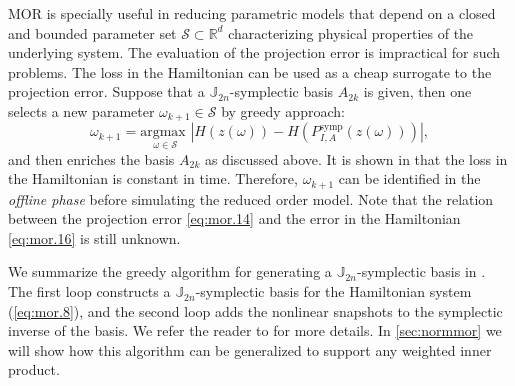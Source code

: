 MOR is specially useful in reducing parametric models that depend on a closed and bounded parameter set $\mathcal{S} \subset \mathbb R^{d}$ characterizing physical properties of the underlying system. The evaluation of the projection error is impractical for such problems. The loss in the Hamiltonian can be used as a cheap surrogate to the projection error. Suppose that a $\mathbb J_{2n}$-symplectic basis $A_{2k}$ is given, then one selects a new parameter $\omega_{k+1} \in \mathcal{S}$ by greedy approach:
\begin{equation} \label{eq:mor.16}
	\omega_{k+1} = \underset{\omega \in \mathcal{S}}{\text{argmax } } | H(z(\omega)) - H(P^\text{symp}_{I,A}(z(\omega))) |,
\end{equation}
and then enriches the basis $A_{2k}$ as discussed above. It is shown in \cite{doi:10.1137/17M1111991} that the loss in the Hamiltonian is constant in time. Therefore, $\omega_{k+1}$ can be identified in the \emph{offline phase} before simulating the reduced order model. Note that the relation between the projection error \cref{eq:mor.14} and the error in the Hamiltonian \cref{eq:mor.16} is still unknown.

We summarize the greedy algorithm for generating a $\mathbb J_{2n}$-symplectic basis in . The first loop constructs a $\mathbb J_{2n}$-symplectic basis for the Hamiltonian system (\ref{eq:mor.8}), and the second loop adds the nonlinear snapshots to the symplectic inverse of the basis. We refer the reader to \cite{doi:10.1137/17M1111991} for more details. In \cref{sec:normmor} we will show how this algorithm can be generalized to support any weighted inner product.

